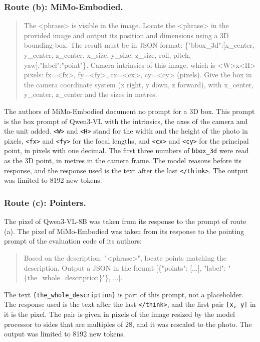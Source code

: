 \subsubsection{Route (b): MiMo-Embodied.}
\begin{quote}\small\ttfamily\raggedright
The <phrase> is visible in the image. Locate the <phrase> in the provided image and output its position and dimensions using a 3D bounding box. The result must be in JSON format: \{"bbox\_3d":[x\_center, y\_center, z\_center, x\_size, y\_size, z\_size, roll, pitch, yaw],\allowbreak{}"label":"point"\}. Camera intrinsics of this image, which is <W>x<H> pixels: fx=<fx>, fy=<fy>, cx=<cx>, cy=<cy> (pixels). Give the box in the camera coordinate system (x right, y down, z forward), with x\_center, y\_center, z\_center and the sizes in metres.
\end{quote}
The authors of MiMo-Embodied document no prompt for a 3D box.
This prompt is the box prompt of Qwen3-VL with the intrinsics, the axes of the camera and the unit added.
\texttt{<W>} and \texttt{<H>} stand for the width and the height of the photo in pixels, \texttt{<fx>} and \texttt{<fy>} for the focal lengths, and \texttt{<cx>} and \texttt{<cy>} for the principal point, in pixels with one decimal.
The first three numbers of \texttt{bbox\_3d} were read as the 3D point, in metres in the camera frame.
The model reasons before its response, and the response used is the text after the last \texttt{</think>}.
The output was limited to 8192 new tokens.

\subsubsection{Route (c): Pointers.}
The pixel of Qwen3-VL-8B was taken from its response to the prompt of route (a).
The pixel of MiMo-Embodied was taken from its response to the pointing prompt of the evaluation code of its authors:
\begin{quote}\small\ttfamily\raggedright
Based on the description: "<phrase>", locate points matching the description. Output a JSON in the format [\{"points": [...], "label": "\{the\_whole\_description\}"\}, ...].
\end{quote}
The text \texttt{\{the\_whole\_description\}} is part of this prompt, not a placeholder.
The response used is the text after the last \texttt{</think>}, and the first pair \texttt{[x, y]} in it is the pixel.
The pair is given in pixels of the image resized by the model processor to sides that are multiples of 28, and it was rescaled to the photo.
The output was limited to 8192 new tokens.

